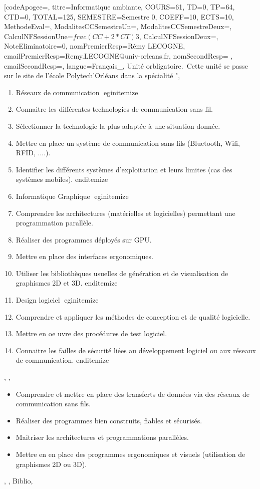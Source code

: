 \module[codeApogee={},
titre={Informatique ambiante},
COURS={61},
TD={0},
TP={64},
CTD={0},
TOTAL={125},
SEMESTRE={Semestre 0},
COEFF={10},
ECTS={10},
MethodeEval={},
ModalitesCCSemestreUn={},
ModalitesCCSemestreDeux={},
CalculNFSessionUne={$frac{(CC+2*CT)}{3}$},
CalculNFSessionDeux={},
NoteEliminatoire={0},
nomPremierResp={Rémy LECOGNE},
emailPremierResp={Remy.LECOGNE@univ-orleans.fr},
nomSecondResp={ },
emailSecondResp={},
langue={Français_},
{Unité orbligatoire.\
Cette unité se passe sur le site de l'école Polytech'Orléans dans la spécialité "},
{\begin{enumerate}
\item  Réseaux de communication
 egin{itemize}
 \item  Connaitre les différentes technologies de communication sans fil.
 \item  Sélectionner la technologie la plus adaptée à une situation donnée.
 \item  Mettre en place un système de communication sans fils (Bluetooth, Wifi, RFID, ....).
 \item  Identifier les différents systèmes d'exploitation et leurs limites (cas des systèmes mobiles).
 end{itemize} 
\item  Informatique Graphique
 egin{itemize}
 \item  Comprendre les architectures (matérielles et logicielles) permettant une programmation parallèle.
 \item  Réaliser des programmes déployés sur GPU.
 \item  Mettre en place des interfaces ergonomiques.
 \item  Utiliser les bibliothèques usuelles de génération et de visualisation de graphismes 2D et 3D.
 end{itemize} 
\item  Design logiciel
 egin{itemize}
 \item  Comprendre et appliquer les méthodes de conception et de qualité logicielle.
 \item  Mettre en oe uvre des procédures de test logiciel.
 \item  Connaitre les failles de sécurité liées au développement logiciel ou aux réseaux de communication.
 end{itemize}
\end{enumerate}},
{},
{\begin{itemize}
\item Comprendre et mettre en place des transferts de données via des réseaux de communication sans fils.
\item Réaliser des programmes bien construits, fiables et sécurisés.
\item Maitriser les architectures et programmations parallèles.
\item Mettre en en place des programmes ergonomiques et visuels (utilisation de graphismes 2D ou 3D).
\end{itemize}},
{},
{Biblio},

